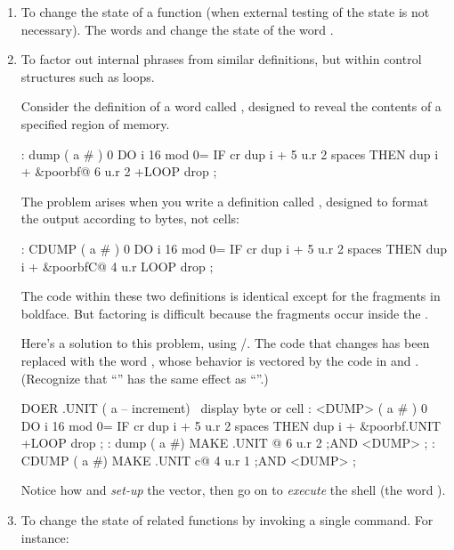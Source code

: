 \begin{enumerate}
\item To change the state of a function (when external testing of the
state is not necessary). The words  and 
change the state of the word .

\item To factor out internal phrases from similar definitions, but within
control structures such as loops.

Consider the definition of a word called , designed to reveal the
contents of a specified region of memory.

\begin{Code}[commandchars=\&\{\}]
: dump  ( a # )
   0 DO  i 16 mod 0= IF  cr  dup i +  5 u.r  2 spaces  THEN
   dup i +  &poorbf{@ 6 u.r  2 +LOOP}  drop ;
\end{Code}
The problem arises when you write a definition called ,
designed to format the output according to bytes, not cells:

\begin{Code}[commandchars=\&\{\}]
: CDUMP  ( a # )
   0 DO  i 16 mod 0= IF  cr  dup i +  5 u.r  2 spaces  THEN
   dup i +  &poorbf{C@  4 u.r  LOOP} drop ;
\end{Code}

The code within these two definitions is identical except for the
fragments in boldface. But factoring is difficult because the fragments
occur inside the .

Here's a solution to this problem, using /. The
code that changes has been replaced with the word , whose
behavior is vectored by the code in  and .
(Recognize that ``'' has the same effect as
``''.)

\begin{Code}[commandchars=\&\{\}]
DOER .UNIT ( a -- increment)  \ display byte or cell
: <DUMP>  ( a # )
   0 DO  i 16 mod 0= IF  cr  dup i +  5 u.r  2 spaces  THEN
   dup i + &poorbf{.UNIT}  +LOOP  drop ;
: dump   ( a #)  MAKE .UNIT  @  6 u.r  2 ;AND <DUMP> ;
: CDUMP ( a #)   MAKE .UNIT c@  4 u.r  1 ;AND <DUMP> ;
\end{Code}
Notice how  and  \emph{set-up} the vector,
then go on to \emph{execute} the shell (the word ).

\item To change the state of related functions by invoking a single
command. For instance:


\end{enumerate}
